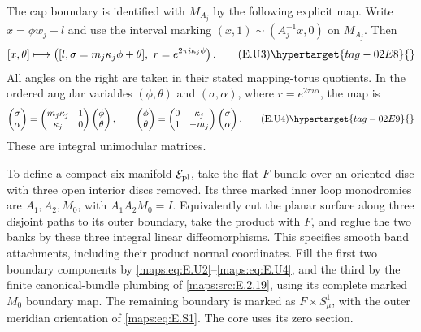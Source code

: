 \begin{proposition}
The cap boundary is identified with $M_{A_j}$ by the following
explicit map.  Write $x=\phi w_j+l$ and use the interval marking
$(x,1)\sim(A_j^{-1}x,0)$ on $M_{A_j}$.  Then
\[
 [x,\theta]\longmapsto
 \left([l,\sigma=m_j\kappa_j\phi+\theta],
                         \ r=e^{2\pi i\kappa_j\phi}\right).
 \tag{E.U3}\hypertarget{tag-02E8}{}\label{maps:eq:E.U3}
\]
All angles on the right are taken in their stated mapping-torus
quotients.  In the ordered angular variables $(\phi,\theta)$
and $(\sigma,\alpha)$, where $r=e^{2\pi i\alpha}$, the map is
\[
 \begin{pmatrix}\sigma\\\alpha\end{pmatrix}
 =
 \begin{pmatrix}m_j\kappa_j&1\\\kappa_j&0\end{pmatrix}
 \begin{pmatrix}\phi\\\theta\end{pmatrix},
 \qquad
 \begin{pmatrix}\phi\\\theta\end{pmatrix}
 =
 \begin{pmatrix}0&\kappa_j\\1&-m_j\end{pmatrix}
 \begin{pmatrix}\sigma\\\alpha\end{pmatrix}.
 \tag{E.U4}\hypertarget{tag-02E9}{}\label{maps:eq:E.U4}
\]
These are integral unimodular matrices.

To define a compact six-manifold $\mathcal E_{\rm pl}$, take the
flat $F$-bundle over an oriented disc with three open interior
discs removed.  Its three marked inner loop monodromies are
$A_1,A_2,M_0$, with $A_1A_2M_0=I$.  Equivalently cut the planar
surface along three disjoint paths to its outer boundary, take
the product with $F$, and reglue the two banks by these three
integral linear diffeomorphisms.  This specifies smooth band
attachments, including their product normal coordinates.
Fill the first two boundary components by \eqref{maps:eq:E.U2}--\eqref{maps:eq:E.U4}, and
the third by the finite canonical-bundle plumbing of \ref{maps:src:E.2.19},
using its complete marked $M_0$ boundary map.  The remaining
boundary is marked as $F\times S^1_\mu$, with the outer meridian
orientation of \eqref{maps:eq:E.S1}.  The core uses its zero section.


\end{proposition}
